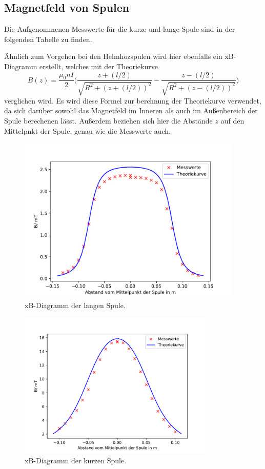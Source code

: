 \subsection{Magnetfeld von Spulen}
\noindent Die Aufgenommenen Messwerte für die kurze und lange
Spule sind in der folgenden Tabelle zu finden.

Ähnlich zum Vorgehen bei den Helmhozspulen wird hier
ebenfalls ein xB-Diagramm erstellt, welches mit
der Theoriekurve
\begin{equation}
  B(z)=\frac{\mu_{0}nI}{2}\Biggl(\frac{z+(l/2)}{\sqrt{R^2+(z+(l/2))^2}}-\frac{z-(l/2)}{\sqrt{R^2+(z-(l/2))^2}}\Biggr)
  \label{eqn:inspule}
\end{equation}
verglichen wird. Es wird diese Formel zur berchnung der Theoriekurve verwendet, da
sich darüber sowohl das Magnetfeld im Inneren als auch im Außenbereich der
Spule berechenen lässt. Außerdem beziehen sich hier die
Abstände $z$ auf den Mittelpnkt der Spule, genau wie
die Messwerte auch.

\begin{figure}[H]
  \centering
  \includegraphics[height=8cm]{LangeSpule.pdf}
  \caption{xB-Diagramm der langen Spule.}
  \label{fig:LangeSpule}
\end{figure}
\begin{figure}[H]
  \centering
  \includegraphics[height=7cm]{KurzeSpule.pdf}
  \caption{xB-Diagramm der kurzen Spule.}
  \label{fig:KurzeSpule}
\end{figure}

